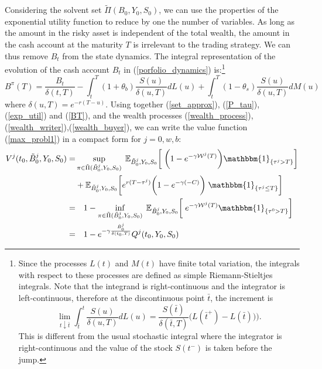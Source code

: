 Considering the solvent set $\tilde \Pi(B_0,Y_0,S_0)$, we can use the properties of the exponential utility function to reduce by one 
the number of variables.
As long as the amount in the risky asset is independent of the total wealth, the amount in the 
cash account at the maturity $T$ is irrelevant to the trading strategy. We can thus remove $B_t$ from the state dynamics.
The integral representation of the evolution of the cash account $B_t$ in (\ref{porfolio_dynamics}) is:\footnote{Since the processes $L(t)$ and $M(t)$ have finite total variation, 
the integrals with respect to these processes are defined as simple Riemann-Stieltjes integrals. Note that the integrand is right-continuous and the integrator is left-continuous,
therefore at the discontinuous point $\bar t$, the increment is 
\begin{equation*}
 \lim_{t \downarrow \bar t } \int_{\bar t}^t \frac{S(u)}{\delta(u,T)} dL(u) =  \frac{S(\bar t)}{\delta(\bar t,T)} \bigl( L(\bar t^+) - L(\bar t) ) \bigr). 
\end{equation*}
This is different from the usual stochastic integral where the integrator is right-continuous and the value of the stock $S(t^-)$ is taken before the jump.}
\begin{equation}\label{BT}
B^{\pi}(T) =  \frac{B_t}{\delta(t,T)} - \int_{t}^T
(1+\theta_b)\frac{S(u)}{\delta(u,T)} dL(u) + \int_{t}^T
 (1-\theta_s) \frac{S(u)}{\delta(u,T)} dM(u) 
\end{equation}
where $\delta(u,T) = e^{-r(T-u)}$.
Using together (\ref{set_approx}), (\ref{P_tau}), (\ref{exp_util}) and (\ref{BT}), and the wealth processes (\ref{wealth_process}),(\ref{wealth_writer}),(\ref{wealth_buyer}), 
we can write the value function (\ref{max_probl1}) in a compact form for 
$j=0,w,b$:
\begin{align} \label{var_reduct} \nonumber
V^j(t_0,\tilde B^j_0,Y_0,S_0) =& \sup_{\pi \in \tilde \Pi(\tilde B^j_0,Y_0,S_0)} \; \E_{\tilde B^j_0,Y_0,S_0}\biggl[ \; 
             \biggr( 1- e^{-\gamma \mathcal{W}^j(T) }\biggr) \mathbbm{1}_{\{\tau^j > T\}} \biggr]  \\ \nonumber 
             & + \E_{\tilde B^j_0,Y_0,S_0} \biggr[ 
             e^{r(T-\tau^j)} \biggr(1-e^{-\gamma(-C)} \biggr)\; 
             \mathbbm{1}_{\{\tau^j \leq T\}} \biggr] \\ \nonumber
	     =& \hspace{1em} 1 
	     -\inf_{\pi \in \tilde \Pi(\tilde B^j_0,Y_0,S_0)} \; \E_{\tilde B^j_0,Y_0,S_0}\biggl[ \;  \nonumber
	      e^{-\gamma \mathcal{W}^j(T)} 
	      \mathbbm{1}_{\{\tau^0 > T\}} \biggr] \\
	     =& \hspace{1em}1- e^{-\gamma \frac{\tilde B^j_0}{\delta(t_0,T)}} Q^j(t_0,Y_0,S_0)
\end{align}
